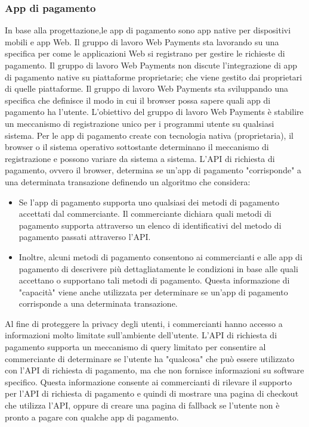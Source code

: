 \documentclass[italian]{article}
\begin{document}
	\subsubsection{App di pagamento}
	In base alla progettazione,le app di pagamento sono app native per dispositivi mobili e app Web. Il gruppo di lavoro Web Payments sta lavorando su una specifica per come le applicazioni Web si registrano per gestire le richieste di pagamento. Il gruppo di lavoro Web Payments non discute l'integrazione di app di pagamento native su piattaforme proprietarie; che viene gestito dai proprietari di quelle piattaforme.
	Il gruppo di lavoro Web Payments sta sviluppando una specifica che definisce il modo in cui il browser possa sapere quali app di pagamento ha l'utente. L'obiettivo del gruppo di lavoro Web Payments è stabilire un meccanismo di registrazione unico per i programmi utente su qualsiasi sistema.
	Per le app di pagamento create con tecnologia nativa (proprietaria), il browser o il sistema operativo sottostante determinano il meccanismo di registrazione e possono variare da sistema a sistema.
	L'API di richiesta di pagamento, ovvero il browser, determina se un'app di pagamento "corrisponde" a una determinata transazione definendo un algoritmo che considera:
	\begin{itemize}
	\item Se l'app di pagamento supporta uno qualsiasi dei metodi di pagamento accettati dal commerciante. Il commerciante dichiara quali metodi di pagamento supporta attraverso un elenco di identificativi del metodo di pagamento passati attraverso l'API.
	\item Inoltre, alcuni metodi di pagamento consentono ai commercianti e alle app di pagamento di descrivere più dettagliatamente le condizioni in base alle quali accettano o supportano tali metodi di pagamento. Questa informazione di "capacità" viene anche utilizzata per determinare se un'app di pagamento corrisponde a una determinata transazione.
	\end{itemize}
	Al fine di proteggere la privacy degli utenti, i commercianti hanno accesso a informazioni molto limitate sull'ambiente dell'utente. L'API di richiesta di pagamento supporta un meccanismo di query limitato per consentire al commerciante di determinare se l'utente ha "qualcosa" che può essere utilizzato con l'API di richiesta di pagamento, ma che non fornisce informazioni su software specifico. Questa informazione consente ai commercianti di rilevare il supporto per l'API di richiesta di pagamento e quindi di mostrare una pagina di checkout che utilizza l'API, oppure di creare una pagina di fallback se l'utente non è pronto a pagare con qualche app di pagamento.
\end{document}
